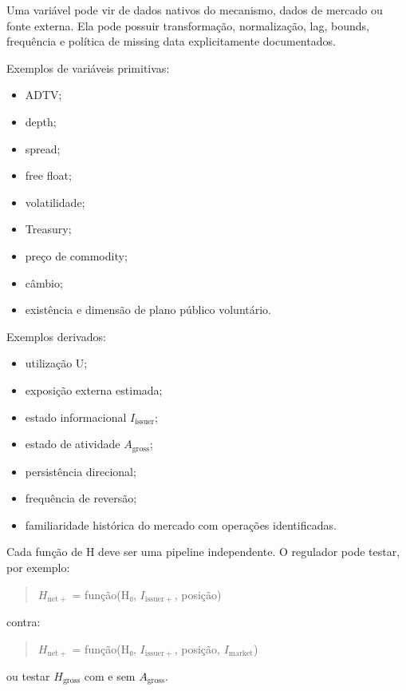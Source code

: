 \documentclass[
  a4paper,
]{article}
\providecommand{\tightlist}{%
  \setlength{\itemsep}{0pt}\setlength{\parskip}{0pt}}
\begin{document}
Uma variável pode vir de dados nativos do mecanismo, dados de mercado ou
fonte externa. Ela pode possuir transformação, normalização, lag,
bounds, frequência e política de missing data explicitamente
documentados.

Exemplos de variáveis primitivas:

\begin{itemize}
\tightlist
\item
  ADTV;
\item
  depth;
\item
  spread;
\item
  free float;
\item
  volatilidade;
\item
  Treasury;
\item
  preço de commodity;
\item
  câmbio;
\item
  existência e dimensão de plano público voluntário.
\end{itemize}

Exemplos derivados:

\begin{itemize}
\tightlist
\item
  utilização U;
\item
  exposição externa estimada;
\item
  estado informacional \(I_{\mathrm{issuer}}\);
\item
  estado de atividade \(A_{\mathrm{gross}}\);
\item
  persistência direcional;
\item
  frequência de reversão;
\item
  familiaridade histórica do mercado com operações identificadas.
\end{itemize}

Cada função de H deve ser uma pipeline independente. O regulador pode
testar, por exemplo:

\begin{quote}
\(H_{\mathrm{net}+}\) = função(H₀, \(I_{\mathrm{issuer}+}\), posição)
\end{quote}

contra:

\begin{quote}
\(H_{\mathrm{net}+}\) = função(H₀, \(I_{\mathrm{issuer}+}\), posição,
\(I_{\mathrm{market}}\))
\end{quote}

ou testar \(H_{\mathrm{gross}}\) com e sem \(A_{\mathrm{gross}}\).
\end{document}
